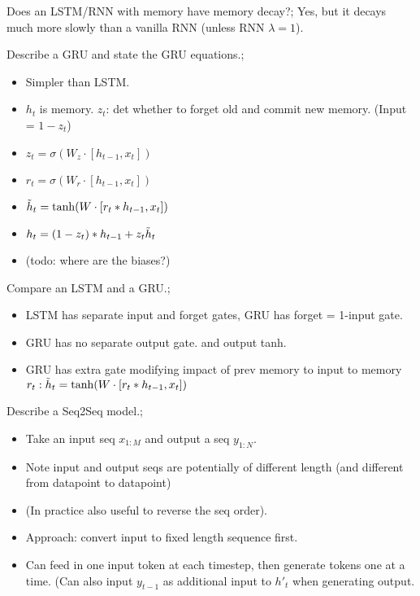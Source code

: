 \documentclass{article}
\begin{document}
Does an LSTM/RNN with memory have memory decay?; Yes, but it decays much more slowly than a vanilla RNN (unless RNN $\lambda = 1$).


Describe a GRU and state the GRU equations.; \begin{itemize}
    \item Simpler than LSTM. 
    \item $h_t$ is memory. $z_t$: det whether to forget old and commit new memory. (Input = $1-z_t$)
    \item $z_t = \sigma(W_z \cdot [h_{t-1}, x_t])$
    \item $r_t = \sigma(W_r \cdot [h_{t-1}, x_t])$
    \item $\Tilde{h}_t = \tanh(W\cdot [r_t * h_{t-1}, x_t])$
    \item $h_t = (1-z_t)*h_{t-1} + z_t \Tilde{h}_t$
    \item (todo: where are the biases?)
\end{itemize}

Compare an LSTM and a GRU.; \begin{itemize}
    \item LSTM has separate input and forget gates, GRU has forget = 1-input gate.
    \item GRU has no separate output gate. and output tanh.
    \item GRU has extra gate modifying impact of prev memory to input to memory $r_t: \Tilde{h}_t = \tanh(W\cdot [r_t * h_{t-1}, x_t])$
\end{itemize}

Describe a Seq2Seq model.; \begin{itemize}
    \item Take an input seq $x_{1:M}$ and output a seq $y_{1:N}$. 
    \item Note input and output seqs are potentially of different length (and different from datapoint to datapoint)
    \item (In practice also useful to reverse the seq order).
    \item Approach: convert input to fixed length sequence first.
    \item Can feed in one input token at each timestep, then generate tokens one at a time. (Can also input $y_{t-1}$ as additional input to $h'_t$ when generating output.
\end{itemize}
\end{document}
